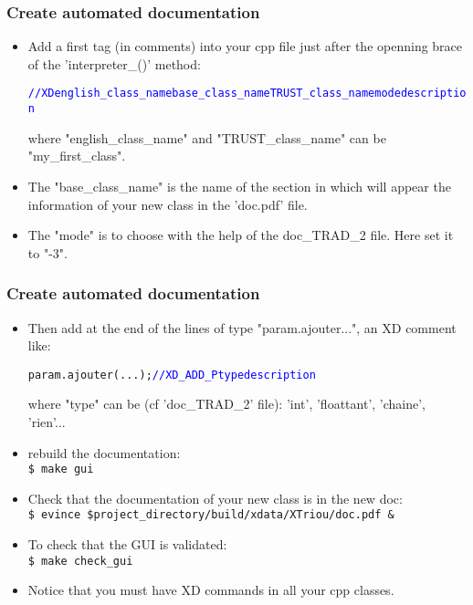\documentclass[10pt, hyperref={unicode=true,pdfusetitle, bookmarks=true,bookmarksnumbered=false,bookmarksopen=false, breaklinks=false,pdfborder={0 0 1},backref=true,colorlinks=true,linkcolor=darkblue,pageanchor, urlcolor=darkblue}]{beamer}
\begin{document}
\begin{frame}
\frametitle{Create automated documentation}
\begin{block}{}

\begin{itemize}
\item Add a first tag (in comments) into your cpp file just after the openning brace of the 'interpreter\_()' method:\\
\begin{alltt}
\textcolor{blue}{// XD english\_class\_name base\_class\_name TRUST\_class\_name mode description}
\end{alltt}
where "english\_class\_name" and "TRUST\_class\_name" can be "my\_first\_class".
\item The "base\_class\_name" is the name of the section in which will appear the information of your new class in the 'doc.pdf' file.
\item The "mode" is to choose with the help of the doc\_TRAD\_2 file. Here set it to "-3".
\end{itemize}

\end{block}
\end{frame}
\begin{frame}
\frametitle{Create automated documentation}
\begin{block}{}

\begin{itemize}
\item Then add at the end of the lines of type "param.ajouter...", an XD comment like:\\
\begin{alltt}
param.ajouter(...);  \textcolor{blue}{// XD\_ADD\_P type description}
\end{alltt}
where "type" can be (cf 'doc\_TRAD\_2' file): 'int', 'floattant', 'chaine', 'rien'...
\item rebuild the documentation:\\
\texttt{\$ make gui}
\item Check that the documentation of your new class is in the new doc:\\
\texttt{\$ evince \$project\_directory/build/xdata/XTriou/doc.pdf \&}
\item To check that the GUI is validated:\\
\texttt{\$ make check\_gui}
\item Notice that you must have XD commands in all your cpp classes.
\end{itemize}

\end{block}
\end{frame}
\end{document}
